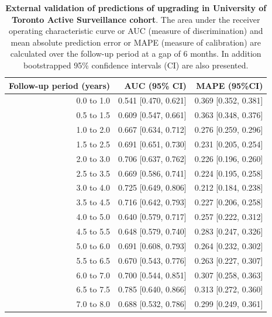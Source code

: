 \begin{table}[!htb]
\small\sf\centering
\caption{\textbf{External validation of predictions of upgrading in University of Toronto Active Surveillance cohort}. The area under the receiver operating characteristic curve or AUC (measure of discrimination) and mean absolute prediction error or MAPE (measure of calibration) are calculated over the follow-up period at a gap of 6 months. In addition bootstrapped 95\% confidence intervals (CI) are also presented.}
\label{tab:AUC_PE_Toronto}
\begin{tabular}{r|r|r}
\hline
\hline
Follow-up period (years) & AUC (95\% CI) & MAPE (95\%CI)\\ 
\hline
0.0 to 1.0 & 0.541 [0.470, 0.621] & 0.369 [0.352, 0.381]\\
0.5 to 1.5 & 0.609 [0.547, 0.661] & 0.363 [0.348, 0.376]\\
1.0 to 2.0 & 0.667 [0.634, 0.712] & 0.276 [0.259, 0.296]\\
1.5 to 2.5 & 0.691 [0.651, 0.730] & 0.231 [0.205, 0.254]\\
2.0 to 3.0 & 0.706 [0.637, 0.762] & 0.226 [0.196, 0.260]\\
2.5 to 3.5 & 0.669 [0.586, 0.741] & 0.224 [0.195, 0.258]\\
3.0 to 4.0 & 0.725 [0.649, 0.806] & 0.212 [0.184, 0.238]\\
3.5 to 4.5 & 0.716 [0.642, 0.793] & 0.227 [0.206, 0.258]\\
4.0 to 5.0 & 0.640 [0.579, 0.717] & 0.257 [0.222, 0.312]\\
4.5 to 5.5 & 0.648 [0.579, 0.740] & 0.283 [0.247, 0.326]\\
5.0 to 6.0 & 0.691 [0.608, 0.793] & 0.264 [0.232, 0.302]\\
5.5 to 6.5 & 0.670 [0.543, 0.776] & 0.263 [0.227, 0.307]\\
6.0 to 7.0 & 0.700 [0.544, 0.851] & 0.307 [0.258, 0.363]\\
6.5 to 7.5 & 0.785 [0.640, 0.866] & 0.313 [0.272, 0.360]\\
7.0 to 8.0 & 0.688 [0.532, 0.786] & 0.299 [0.249, 0.361]\\
\hline
\end{tabular}	
\end{table}

